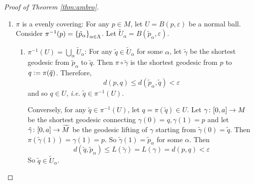 \begin{enumerate}[label=\arabic{*}.]
\begin{proof}[Proof of Theorem \ref{thm:ambro}]
\begin{enumerate}[label=(\arabic{*})]
			\item $\pi$ is a evenly covering: For any $p \in M$, let $U = B(p,\varepsilon)$ be a normal ball. Consider $\pi^{-1}(p) = \left\{\tilde{p}_\alpha\right\}_{\alpha \in \Lambda}$. Let $\tilde{U}_\alpha = B(\tilde{p}_\alpha,\varepsilon)$.
			\begin{enumerate}[label=\Roman*.]
				\item $\pi^{-1}(U) = \bigcup_\alpha \tilde{U}_\alpha$: For any $\tilde{q} \in \tilde{U}_\alpha$ for some $\alpha$, let $\tilde{\gamma}$ be the shortest geodesic from $\tilde{p}_\alpha$ to $\tilde{q}$. Then $\pi \circ \tilde{\gamma}$ is the shortest geodesic from $p$ to $q \vcentcolon= \pi(\tilde{q})$. Therefore, 
				\begin{equation*}	
					d(p,q) \leq d(\tilde{p}_\alpha,\tilde{q}) < \varepsilon
				\end{equation*}
				and so $q \in U$, \emph{i.e.} $\tilde{q}\in \pi^{-1}(U)$. 

				Conversely, for any $\tilde{q}\in \pi^{-1}(U)$, let $q = \pi(\tilde{q}) \in U$. Let $\gamma \colon [0,a] \rightarrow M$ be the shortest geodesic connecting $\gamma(0) = q, \gamma(1)=p$ and let $\tilde{\gamma} \colon [0,a] \rightarrow \widetilde{M}$ be the geodesic lifting of $\gamma$ starting from $\tilde{\gamma}(0) = \tilde{q}$. Then $\pi(\tilde{\gamma}(1)) = \gamma(1) = p$. So $\tilde{\gamma}(1) = \tilde{p}_\alpha$ for some $\alpha$. Then
				\begin{equation*}
					d(\tilde{q},\tilde{p}_\alpha) \leq L(\tilde{\gamma}) = L(\gamma) = d(p,q) < \varepsilon
				\end{equation*}
				So $\tilde{q} \in \tilde{U}_\alpha$.


\end{enumerate}
\end{enumerate}
\end{proof}
\end{enumerate}
